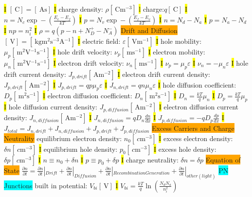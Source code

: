 \documentclass[fontsize=3]{scrartcl}
\begin{document}
\hl{I}
$[\SI{}{\coulomb}] = [\SI{}{\ampere \second}] $
\hl{I}
charge density: $\rho [ \SI{}{\coulomb \meter^{-3} } ]$
\hl{l}
charge:$q [ \SI{}{\coulomb} ]$
\hl{I}
$n = N_c \exp-(\frac{E_c - E_f}{kT})$
\hl{I}
$p = N_v \exp-(\frac{E_f - E_v}{kT})$
\hl{I}
$n = N_d - N_a$
\hl{I}
$p = N_a - N_d$
\hl{I}
$np = n_i^2$
\hl{I}
$\rho = q(p-n+N_D^+ - N_A^-)$
\colorbox{Orange}{Drift and Diffusion}
$[\SI{}{\volt}] = [\SI{}{\kilogram \meter^{2} \second^{-3} \ampere^{-1} }]$
\hl{I}
electric field: $ \varepsilon [ \SI{}{ \volt \meter^{-1}} ] $ 
\hl{I}
hole mobility: $\mu_p [ \SI{}{ \meter^{2} \volt^{-1} \second^{-1} } ] $
\hl{I}
hole drift velocity: $ \nu_p  [ \SI{}{ \meter \second^{-1} } ]$
\hl{I}
electron mobility: $\mu_n [ \SI{}{ \meter^{2} \volt^{-1} \second^{-1} } ] $
\hl{I}
electron drift velocity: $ \nu_n  [ \SI{}{ \meter \second^{-1} } ]$
\hl{I}
$\nu_p = \mu_p \varepsilon$
\hl{I}
$\nu_n = -\mu_n \varepsilon$
\hl{I}
hole drift current density: $ J_{p,drift} [ \SI{}{ \ampere \meter^{-2} } ] $ 
\hl{I}
electron drift current density: $ J_{p,drift} [ \SI{}{ \ampere \meter^{-2} } ] $
\hl{I}
$ J_{p,drift} = q p \mu_p  \varepsilon$
\hl{I}
$ J_{n,drift} = q n \mu_n  \varepsilon$
\hl{I}
hole diffusion coefficient: $ D_p [ \SI{}{ \meter^{2} \second^{-1} } ] $ 
\hl{I}
electron diffusion coefficient: $ D_n [  \SI{}{ \meter^{2} \second^{-1} } ] $ 
\hl{I}
$D_n = \frac{kT}{q} \mu_n$
\hl{I}
$D_p = \frac{kT}{q} \mu_p$
\hl{I}
hole diffusion current density: $ J_{p, diffusion} [ \SI{}{ \ampere \meter^{-2} } ] $ 
\hl{I}
electron diffusion current density: $ J_{n, diffusion} [ \SI{}{ \ampere \meter^{-2} } ] $
\hl{I}
$J_{n, diffusion} = q D_n \frac{dn}{dx}$
\hl{I}
$J_{p, diffusion} = -q D_p \frac{dp}{dx}$
\hl{I}
$J_{total} = J_{n,drift} + J_{n,diffusion} + J_{p,drift} + J_{p,diffusion}$
\colorbox{Orange}{Excess Carriers and Charge Neutrality}
equilibrium electron density: $n_0 [ \SI{}{ c\meter^{-3} } ] $
\hl{I}
excess electron density: $\delta n [ \SI{}{ c\meter^{-3} } ] $
\hl{I}
equilibrium hole density: $p_0 [ \SI{}{ c\meter^{-3} } ] $
\hl{I}
excess hole density: $\delta p [ \SI{}{ c\meter^{-3} } ] $
\hl{I}
$n \equiv n_0 + \delta n$
\hl{I}
$p \equiv p_0 + \delta p$
\hl{I}
charge neutrality: $\delta n = \delta p$
\colorbox{Orange}{Equation of State}
$\frac{\partial n}{\partial t} = \frac{\partial n}{\partial t}|_{Drift}  +\frac{\partial n}{\partial t}|_{Diffusion} + \frac{\partial n}{\partial t}|_{Recombination Generation} + \frac{\partial n}{\partial t}|_{other(light)}$
\colorbox{Cyan}{PN Junctions}
built in potential: $ V_{bi} [\SI{}{\volt}]  $
\hl{I}
$V_{bi} = \frac{kT}{q}\ln(\frac{N_d N_a}{n_i^2})$
\end{document}

